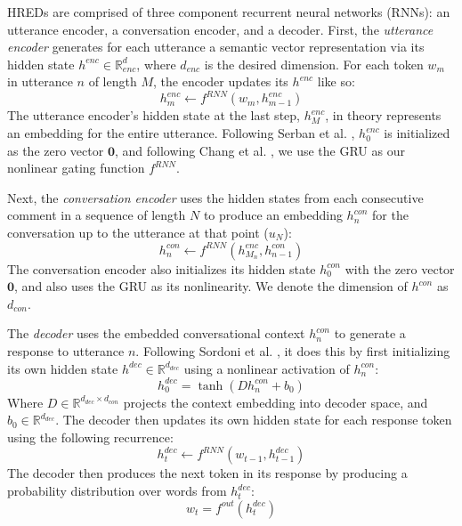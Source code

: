 \documentclass{article}
\begin{document}
HREDs are comprised of three component recurrent neural networks (RNNs): an utterance encoder, a conversation encoder, and a decoder. First, the \textit{utterance encoder} generates for each utterance a semantic vector representation via its hidden state $h^{enc} \in \mathbb{R}^d_{enc}$, where $d_{enc}$ is the desired dimension. For each token $w_m$ in utterance $n$ of length $M$, the encoder updates its $h^{enc}$ like so:
\begin{equation}
  h^{enc}_m \gets f^{RNN}(w_{m}, h^{enc}_{m-1})
\end{equation}
The utterance encoder's hidden state at the last step, $h^{enc}_{M}$, in theory represents an embedding for the entire utterance. Following Serban et al. \citeyear{serban2016building}, $h^{enc}_{0}$ is initialized as the zero vector $\mathbf{0}$, and following Chang et al. \citeyear{Chang-Trouble:19}, we use the GRU \cite{cho2014learning} as our nonlinear gating function $f^{RNN}$.

Next, the \textit{conversation encoder} uses the hidden states from each consecutive comment in a sequence of length $N$ to produce an embedding $h^{con}_n$ for the conversation up to the utterance at that point ($u_N$):
\begin{equation}
  h^{con}_n \gets f^{RNN}(h^{enc}_{M_n}, h^{con}_{n-1})
\end{equation}
The conversation encoder also initializes its hidden state $h^{con}_0$ with the zero vector $\mathbf{0}$, and also uses the GRU as its nonlinearity. We denote the dimension of $h^{con}$ as $d_{con}$.

The \textit{decoder} uses the embedded conversational context $h^{con}_n$ to generate a response to utterance $n$. Following Sordoni et al. \citeyear{sordoni2015hierarchical}, it does this by first initializing its own hidden state $h^{dec} \in \mathbb{R}^{d_{dec}}$ using a nonlinear activation of $h^{con}_n$:
\begin{equation}
  h^{dec}_0 = \tanh(D h^{con}_n + b_0)
\end{equation}
Where $D \in \mathbb{R}^{d_{dec} \times d_{con}}$ projects the context embedding into decoder space, and $b_0 \in \mathbb{R}^{d_{dec}}$. 
The decoder then updates its own hidden state for each response token using the following recurrence:
\begin{equation}
  h^{dec}_{t} \gets f^{RNN}(w_{t-1}, h^{dec}_{t-1})
\end{equation}
The decoder then produces the next token in its response by producing a probability distribution over words from $h^{dec}_t$:
\begin{equation}
  w_t = f^{out}(h^{dec}_t)
\end{equation}
\end{document}
